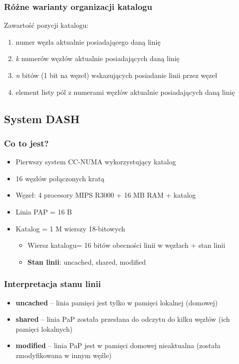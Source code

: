 		\subsubsection{Różne warianty organizacji katalogu}
			Zawartość pozycji katalogu:
			\begin{enumerate}
				\item numer węzła aktualnie posiadającego daną linię
				\item \emph{k} numerów węzłów aktualnie posiadających daną linię
				\item \emph{n} bitów (1 bit na węzeł) wskazujących posiadanie linii przez węzeł
				\item element listy pól z numerami węzłów aktualnie posiadających daną linię
			\end{enumerate}
	\subsection{System DASH}
		\subsubsection{Co to jest?}
			\begin{itemize}
				\item Pierwszy system CC-NUMA wykorzystujący katalog
				\item 16 węzłów połączonych kratą
				\item Węzeł: 4 procesory MIPS R3000 + 16 MB RAM + katalog
				\item Linia PAP = 16 B
				\item Katalog = 1 M wierszy 18-bitowych
				\begin{itemize}
					\item Wiersz katalogu= 16 bitów obecności linii w węzłach + stan linii
					\item \textbf{Stan linii}: uncached, shared, modified
				\end{itemize}
			\end{itemize}
		\subsubsection{Interpretacja stanu linii}
			\begin{itemize}
				\item \textbf{uncached} – linia pamięci jest tylko w pamięci lokalnej (domowej)
				\item \textbf{shared} – linia PaP została przesłana do odczytu do kilku węzłów (ich pamięci lokalnych)
				\item \textbf{modified} – linia PaP jest w pamięci domowej nieaktualna (została zmodyfikowana w innym węźle)
			\end{itemize}
